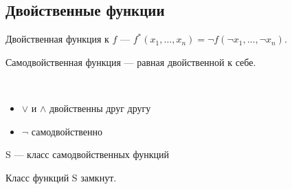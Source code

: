 \subsection{Двойственные функции}

\begin{defn}
    Двойственная функция к $f$ --- $f^*(x_1, \ldots, x_n) = \neg f(\neg x_1, \ldots, \neg x_n)$.
\end{defn}

\begin{defn}
    Самодвойственная функция --- равная двойственной к себе.
\end{defn}

\begin{examples}~
    \begin{itemize}
        \item $\vee$ и $\wedge$ двойственны друг другу
        \item $\neg$ самодвойственно
    \end{itemize}
\end{examples}

\begin{theorem-non}
    S --- класс самодвойственных функций
\end{theorem-non}

\begin{theorem-non}
    Класс функций S замкнут.
\end{theorem-non}